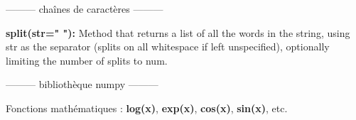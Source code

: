 \begin{center}
--------- chaînes de caractères ---------
\end{center}

\textsf{\textbf{split(str=" "):}} Method that returns a list of all the words in the string, using str as the separator (splits on all whitespace if left unspecified), optionally limiting the number of splits to num.

\begin{center}
--------- bibliothèque numpy ---------
\end{center}

Fonctions mathématiques : \textsf{\textbf{log(x)}}, \textsf{\textbf{exp(x)}}, \textsf{\textbf{cos(x)}}, \textsf{\textbf{sin(x)}}, etc.